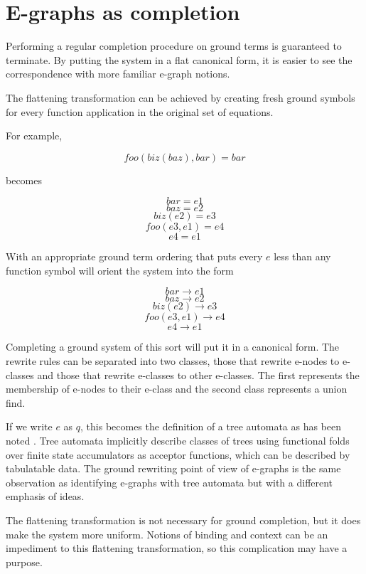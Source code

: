 \documentclass[sigplan,10pt,review,anonymous]{acmart}
\begin{document}

\section{E-graphs as completion}

Performing a regular completion procedure on ground terms is guaranteed to terminate. By putting the system in a flat canonical form, it is easier to see the correspondence with more familiar e-graph notions.

The flattening transformation can be achieved by creating fresh ground symbols for every function application in the original set of equations. %

For example,

$$
foo(biz(baz), bar) = bar
$$

becomes

$$bar = e1$$
$$baz = e2$$
$$biz(e2) = e3$$
$$foo(e3,e1) = e4$$
$$e4 = e1$$


With an appropriate ground term ordering that puts every $e$ less than any function symbol will orient the system into the form

$$bar \rightarrow e1$$
$$baz \rightarrow e2$$
$$biz(e2) \rightarrow  e3$$
$$foo(e3,e1) \rightarrow e4$$
$$e4 \rightarrow e1$$


Completing a ground system of this sort will put it in a canonical form. The rewrite rules can be separated into two classes, those that rewrite e-nodes to e-classes and those that rewrite e-classes to other e-classes. The first represents the membership of e-nodes to their e-class and the second class represents a union find.

If we write $e$ as $q$, this becomes the definition of a tree automata as has been noted \cite{treeautomata}. Tree automata implicitly describe classes of trees using functional folds over finite state accumulators as acceptor functions, which can be described by tabulatable data. The ground rewriting point of view of e-graphs is the same observation as identifying e-graphs with tree automata but with a different emphasis of ideas.

The flattening transformation is not necessary for ground completion, but it does make the system more uniform. Notions of binding and context can be an impediment to this flattening transformation, so this complication may have a purpose.
\end{document}
